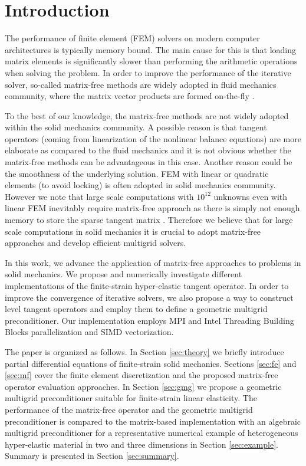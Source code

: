 \documentclass[preprint,12pt,times]{elsarticle}
\begin{document}
\section{Introduction}

The performance of finite element (FEM) solvers on modern computer architectures is typically memory bound.
The main cause for this is that loading matrix elements is significantly slower than performing the arithmetic operations when solving the problem.
In order to improve the performance of the iterative solver, so-called matrix-free methods are
widely adopted in fluid mechanics community, where the matrix vector products are formed on-the-fly \cite{kronbichler12}.

To the best of our knowledge, the matrix-free methods are not widely adopted within the solid mechanics community.
A possible reason is that tangent operators (coming from linearization of the nonlinear balance equations) are
more elaborate as compared to the fluid mechanics and it is not obvious whether the matrix-free methods can be advantageous in this case. Another reason could be the smoothness of the underlying solution. FEM with linear or quadratic elements (to avoid locking) is often adopted in solid mechanics community. However we note that large scale computations with $10^{12}$ unknowns even with linear FEM inevitably require matrix-free approach as there is simply not enough memory to store the sparse tangent matrix \cite{Gmeiner2016}. Therefore we believe that for large scale computations in solid mechanics it is crucial to adopt matrix-free approaches and develop efficient multigrid solvers.

In this work, we advance the application of matrix-free approaches to problems in solid mechanics.
We propose and numerically investigate different implementations of the finite-strain hyper-elastic tangent operator.
In order to improve the convergence of iterative solvers, we also propose a way to construct level tangent operators
and employ them to define a geometric multigrid preconditioner.
Our implementation employs MPI and Intel Threading Building Blocks parallelization and SIMD vectorization.

The paper is organized as follows. In Section \ref{sec:theory} we briefly introduce partial differential equations of finite-strain solid mechanics. Sections \ref{sec:fe} and \ref{sec:mf} cover the finite element discretization and the proposed matrix-free operator evaluation approaches. In Section \ref{sec:gmg} we propose a geometric multigrid preconditioner suitable for finite-strain linear elasticity. The performance of the matrix-free operator and the geometric multigrid preconditioner is compared to the matrix-based implementation with an algebraic multigrid preconditioner for a representative numerical example of heterogeneous hyper-elastic material in two and three dimensions in Section \ref{sec:example}. Summary is presented in Section \ref{sec:summary}.
\end{document}
